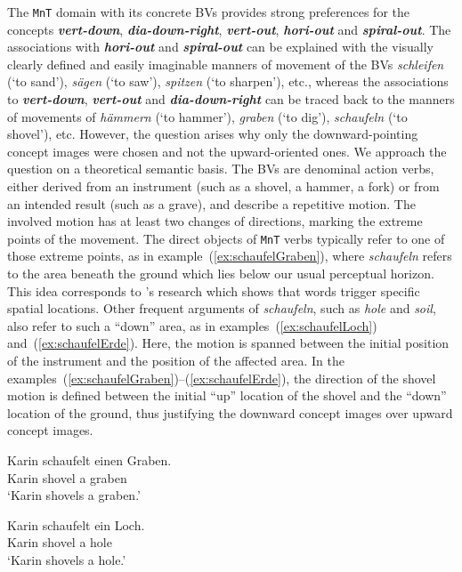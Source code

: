 \documentclass[output=paper]{langsci/langscibook}
\newcommand{\textci}[1]{\textit{\textbf{#1}}}
\begin{document}
The \texttt{MnT} domain with its concrete BVs provides strong
preferences for the concepts \textci{vert-down},
\textci{dia-down-right}, \textci{vert-out}, \textci{hori-out} and
\textci{spiral-out}. The associations with \textci{hori-out} and
\textci{spiral-out} can be explained with the visually clearly defined
and easily imaginable manners of movement of the BVs
\textit{schleifen} (`to sand'), \textit{sägen} (`to saw'),
\textit{spitzen} (`to sharpen'), etc., whereas the associations to
\textci{vert-down}, \textci{vert-out} and \textci{dia-down-right} can
be traced back to the manners of movements of \textit{hämmern} (`to
hammer'), \textit{graben} (`to dig'), \textit{schaufeln} (`to
shovel'), etc. However, the question arises why only the
downward-pointing concept images were chosen and not the upward-oriented ones. We
approach the question on a theoretical semantic basis. The BVs are
denominal action verbs, either derived from an instrument (such as a
shovel, a hammer, a fork) or from an intended result (such as a
grave), and describe a repetitive motion. The involved motion has at
least two changes of directions, marking the extreme points of the
movement. The direct objects of \texttt{MnT} verbs typically refer to
one of those extreme points, as in example~(\ref{ex:schaufelGraben}),
where \textit{schaufeln} refers to the area beneath the ground which
lies below our usual perceptual horizon. This idea corresponds to
\cite{LachmairEtAl:16}'s research which shows that words trigger
specific spatial locations. Other frequent arguments of
\textit{schaufeln}, such as \textit{hole} and \textit{soil}, also
refer to such a ``down'' area, as in examples~(\ref{ex:schaufelLoch})
and~(\ref{ex:schaufelErde}). Here, the motion is spanned between the
initial position of the instrument and the position of the affected
area. In the
examples~(\ref{ex:schaufelGraben})--(\ref{ex:schaufelErde}), the
direction of the shovel motion is defined between the initial ``up''
location of the shovel and the ``down'' location of the ground, thus
justifying the downward concept images over upward concept images.

\ea\label{ex:schaufelGraben} 
\gll Karin schaufelt einen Graben.\\ 
Karin shovel a graben\\
\glt `Karin shovels a graben.'
\z 

\ea\label{ex:schaufelLoch} 
\gll Karin schaufelt ein Loch.\\ 
Karin shovel a hole\\
\glt `Karin shovels a hole.'
\z  
\end{document}
